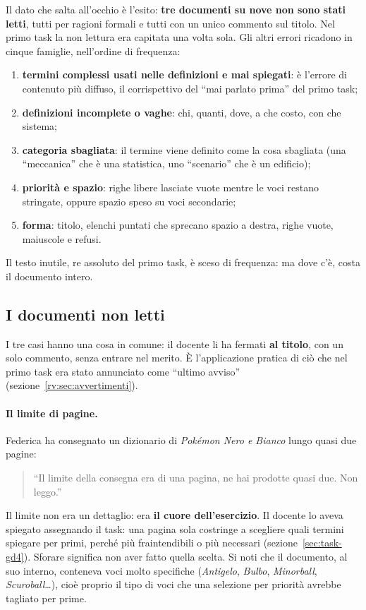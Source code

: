 Il dato che salta all'occhio è l'esito: \textbf{tre documenti su nove non
sono stati letti}, tutti per ragioni formali e tutti con un unico commento
sul titolo. Nel primo task la non lettura era capitata una volta sola. Gli
altri errori ricadono in cinque famiglie, nell'ordine di frequenza:
\begin{enumerate}
  \item \textbf{termini complessi usati nelle definizioni e mai spiegati}: è
        l'errore di contenuto più diffuso, il corrispettivo del ``mai parlato
        prima'' del primo task;
  \item \textbf{definizioni incomplete o vaghe}: chi, quanti, dove, a che
        costo, con che sistema;
  \item \textbf{categoria sbagliata}: il termine viene definito come la cosa
        sbagliata (una ``meccanica'' che è una statistica, uno ``scenario''
        che è un edificio);
  \item \textbf{priorità e spazio}: righe libere lasciate vuote mentre le
        voci restano stringate, oppure spazio speso su voci secondarie;
  \item \textbf{forma}: titolo, elenchi puntati che sprecano spazio a destra,
        righe vuote, maiuscole e refusi.
\end{enumerate}
Il testo inutile, re assoluto del primo task, è sceso di frequenza: ma dove
c'è, costa il documento intero.

\subsection{I documenti non letti}
\label{rv:t2:sec:non-letti}

I tre casi hanno una cosa in comune: il docente li ha fermati \textbf{al
titolo}, con un solo commento, senza entrare nel merito. È l'applicazione
pratica di ciò che nel primo task era stato annunciato come ``ultimo
avviso'' (sezione~\ref{rv:sec:avvertimenti}).

\paragraph{Il limite di pagine.} Federica ha consegnato un dizionario di
\emph{Pokémon Nero e Bianco} lungo quasi due pagine:
\begin{quote}
  ``Il limite della consegna era di una pagina, ne hai prodotte quasi due. Non
  leggo.''
\end{quote}
Il limite non era un dettaglio: era \textbf{il cuore dell'esercizio}. Il
docente lo aveva spiegato assegnando il task: una pagina sola costringe a
scegliere quali termini spiegare per primi, perché più fraintendibili o più
necessari (sezione~\ref{sec:task-gd4}). Sforare significa non aver fatto
quella scelta. Si noti che il documento, al suo interno, conteneva voci molto
specifiche (\emph{Antigelo}, \emph{Bulbo}, \emph{Minorball},
\emph{Scuroball}\dots), cioè proprio il tipo di voci che una selezione per
priorità avrebbe tagliato per prime.

